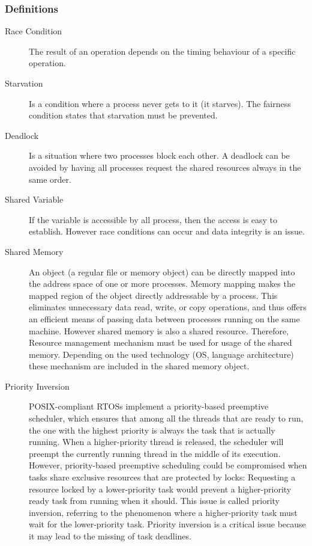 \subsubsection{Definitions}
\begin{description}
	\item[Race Condition]  The result of an operation depends on the timing behaviour of a specific operation.
	\item[Starvation]      Is a condition where a process never gets to it (it starves).
	      The fairness condition states that starvation must be prevented.
	\item[Deadlock]        Is a situation where two processes block each other.
	      A deadlock can be avoided by having all processes request the shared resources always in the same order.
	\item[Shared Variable] If the variable is accessible by all process, then the access is easy to establish.
	      However race conditions can occur and data integrity is an issue.
	\item[Shared Memory] An object (a regular file or memory object) can be directly mapped into the address space of one or more processes.
	      Memory mapping makes the mapped region of the object directly addressable by a process.
	      This eliminates unnecessary data read, write, or copy operations, and thus offers an efficient means of passing data between processes running on the same machine.
	      However shared memory is also a shared resource.
	      Therefore, Resource management mechanism must be used for usage of the shared memory.
	      Depending on the used technology (OS, language architecture) these mechanism are included in the shared memory object.
	\item[Priority Inversion] POSIX-compliant RTOSs implement a priority-based preemptive scheduler, which ensures that among all the threads that are ready to run, the one with the highest priority is always the task that is actually running.
	      When a higher-priority thread is released, the scheduler will preempt the currently running thread in the middle of its execution.
	      However, priority-based preemptive scheduling could be compromised when tasks share exclusive resources that are protected by locks:
	      Requesting a resource locked by a lower-priority task would prevent a higher-priority ready task from running when it should.
	      This issue is called priority inversion, referring to the phenomenon where a higher-priority task must wait for the lower-priority task.
	      Priority inversion is a critical issue because it may lead to the missing of task deadlines.
\end{description}
